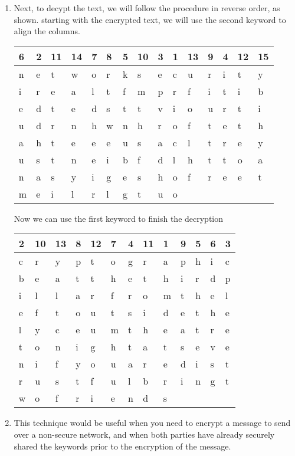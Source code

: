 \documentclass[12pt]{article}
\begin{document}
\begin{enumerate}[label=(\alph*)]
\item Next, to decypt the text, we will follow the procedure in reverse order, as shown.
\newline
starting with the encrypted text, we will use the second keyword to align the columns.
\newline
\newline
\begin{tabular}{ l l l l l l l l l l l l l l l}
6 & 2 & 11 & 14 & 7 & 8 & 5 & 10 & 3 & 	1 & 13 & 9 & 4 & 12 & 15\\
\hline
n & e & t & w & o & r & k & s & e & c & u & r & i & t & y\\
\hline
i & r & e & a & l & t & f & m & p & r & f & i & t & i & b\\
e & d & t & e & d & s & t & t & v & i & o & u & r & t & i\\
u & d & r & n & h & w & n & h & r &  o & f & t & e & t & h\\
a & h & t & e & e & e & u & s & a & c & l & t & r & e & y\\
u & s & t & n & e & i & b & f & d & l & h & t & t & o & a\\
n & a & s & y & i & g & e & s & h & o & f & r & e & e & t\\
m & e & i & l & r & l & g & t & u & o\\
\end{tabular}
\newline
\newline
Now we can use the first keyword to finish the decryption
\newline
\newline
\begin{tabular}{ l l l l l l l l l l l l l }
2 & 10 & 13 & 8 & 12 & 7 & 4 & 11 & 1 & 9 & 5 & 6 & 3\\
\hline
c & r & y & p & t & o & g & r & a & p & h & i & c\\
\hline
b & e & a & t & t & h & e & t & h & i & r & d & p\\
i & l & l & a & r & f & r & o & m & t & h & e & l\\
e & f & t & o & u & t & s & i & d & e & t & h & e\\
l & y & c & e & u & m & t & h & e & a & t & r & e\\
t & o & n & i & g & h & t & a & t & s & e & v & e\\
n & i & f & y & o & u & a & r & e & d & i & s & t\\
r & u & s & t & f & u & l & b & r & i & n & g & t\\
w & o & f & r & i & e & n & d & s\\
\end{tabular}
\item This technique would be useful when you need to encrypt a message to send over a non-secure network, and when both parties have already securely shared the keywords prior to the encryption of the message.
\end{enumerate}
\end{document}
